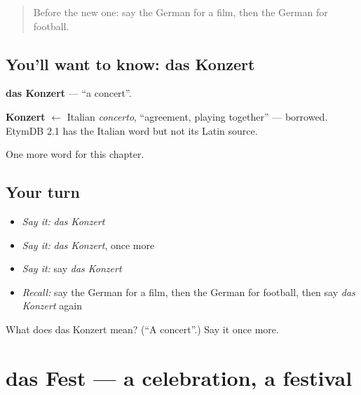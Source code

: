 \label{lesson:GE-C129-konzert}



\begin{quote}
Before the new one: say the German for a film, then the German for football.
\end{quote}

\subsection*{You'll want to know: das Konzert}
\textbf{das Konzert} — \textquotedblleft{}a concert\textquotedblright{}.

\begin{cousinweb}
\textbf{Konzert} $\leftarrow$ Italian \emph{concerto}, \textquotedblleft{}agreement, playing together\textquotedblright{} — borrowed. EtymDB 2.1 has the Italian word but not its Latin source.
\end{cousinweb}

\begin{grammarlens}[title={What you've built}]
One more word for this chapter.
\end{grammarlens}

\subsection*{Your turn}
\begin{itemize}
\raggedright
  \item \emph{Say it:} \emph{das Konzert}
  \item \emph{Say it:} \emph{das Konzert}, once more
  \item \emph{Say it:} say \emph{das Konzert}
  \item \emph{Recall:} say the German for a film, then the German for football, then say \emph{das Konzert} again
\end{itemize}

\begin{tcolorbox}[breakable,colback=teal!4,colframe=teal!35!black,title={Before you move on}]
What does das Konzert mean? (\textquotedblleft{}A concert\textquotedblright{}.) Say it once more.
\end{tcolorbox}
\section[das Fest]{das Fest — a celebration, a festival}

\label{lesson:GE-C129-fest}




